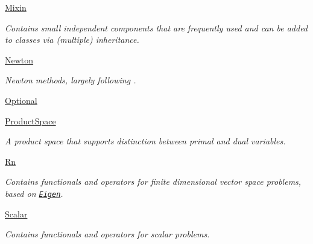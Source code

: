 \begin{DoxyCompactItemize}
 \hyperlink{namespaceSpacy_1_1Mixin}{Mixin}
\begin{DoxyCompactList}\small\item\em Contains small independent components that are frequently used and can be added to classes via (multiple) inheritance. \end{DoxyCompactList}\item 
 \hyperlink{namespaceSpacy_1_1Newton}{Newton}
\begin{DoxyCompactList}\small\item\em Newton methods, largely following \cite{Deuflhard2004}. \end{DoxyCompactList}\item 
 \hyperlink{namespaceSpacy_1_1Optional}{Optional}
\item 
 \hyperlink{namespaceSpacy_1_1ProductSpace}{Product\+Space}
\begin{DoxyCompactList}\small\item\em A product space that supports distinction between primal and dual variables. \end{DoxyCompactList}\item 
 \hyperlink{namespaceSpacy_1_1Rn}{Rn}
\begin{DoxyCompactList}\small\item\em Contains functionals and operators for finite dimensional vector space problems, based on \href{http://eigen.tuxfamily.org}{\tt Eigen}. \end{DoxyCompactList}\item 
 \hyperlink{namespaceSpacy_1_1Scalar}{Scalar}
\begin{DoxyCompactList}\small\item\em Contains functionals and operators for scalar problems. \end{DoxyCompactList}\end{DoxyCompactItemize}
